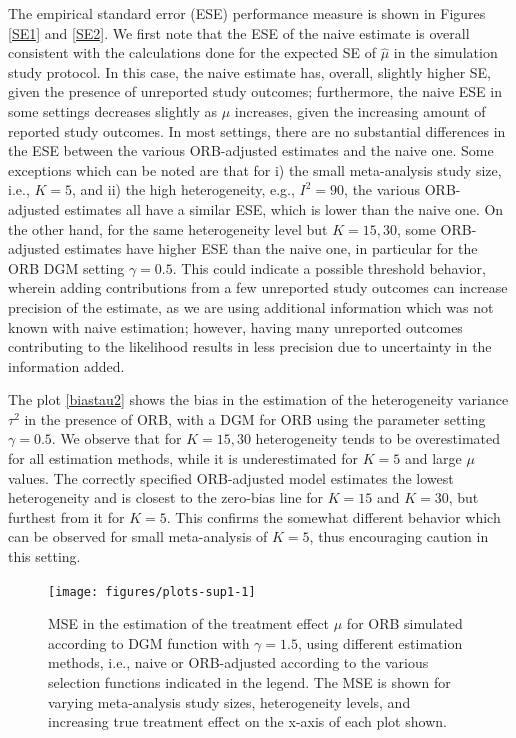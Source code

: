 \documentclass{article}\usepackage[]{graphicx}\usepackage[]{xcolor}
\providecommand{\DIFaddbegin}{} %
\providecommand{\DIFaddend}{} %
\newcommand{\DIFaddincludegraphics}[2][]{{\color{blue}\fbox{\DIFOincludegraphics[#1]{#2}}}} %
\DeclareRobustCommand{\DIFaddbegin}{\DIFOaddbegin \let\includegraphics\DIFaddincludegraphics} %
\DeclareRobustCommand{\DIFaddend}{\DIFOaddend \let\includegraphics\DIFOincludegraphics} %
\begin{document}
\DIFaddbegin \bigskip

\DIFaddend %
The empirical standard error (ESE) performance measure is shown in Figures \ref{SE1} and \ref{SE2}. We first note that the ESE of the naive estimate is overall consistent with the calculations done for the expected SE of $\hat{\mu}$ in the simulation study protocol. In this case, the naive estimate has, overall, slightly higher SE, given the presence of unreported study outcomes; furthermore, the naive ESE in some settings decreases slightly as $\mu$ increases, given the increasing amount of reported study outcomes. In most settings, there are no substantial differences in the ESE between the various ORB-adjusted estimates and the naive one. Some exceptions which can be noted are that for i) the small meta-analysis study size, i.e., $K=5$, and ii) the high heterogeneity, e.g., $I^2=90$, the various ORB-adjusted estimates all have a similar ESE, which is lower than the naive one. On the other hand, for the same heterogeneity level but $K=15, 30$, some ORB-adjusted estimates have higher ESE than the naive one, in particular for the ORB DGM setting $\gamma=0.5$. This could indicate a possible threshold behavior, wherein adding contributions from a few unreported study outcomes can increase precision of the estimate, as we are using additional information which was not known with naive estimation; however, having many unreported outcomes contributing to the likelihood results in less precision due to uncertainty in the information added. 

\DIFaddbegin \bigskip

\DIFaddend The plot \ref{biastau2} shows the bias in the estimation of the heterogeneity variance $\tau^2$ in the presence of ORB, with a DGM for ORB using the parameter setting $\gamma=0.5$. We observe that for $K=15,30$ heterogeneity tends to be overestimated for all estimation methods, while it is underestimated for $K=5$ and large $\mu$ values. The correctly specified ORB-adjusted model estimates the lowest heterogeneity and is closest to the zero-bias line for $K=15$ and $K=30$, but furthest from it for $K=5$. This confirms the somewhat different behavior which can be observed for small meta-analysis of $K=5$, thus encouraging caution in this setting.




\begin{figure}[!hbt]
\centering
\caption{MSE in the estimation of the treatment effect $\mu$ for ORB simulated according to DGM function with $\gamma=1.5$, using different estimation methods, i.e., naive or ORB-adjusted according to the various selection functions indicated in the legend. The MSE is shown for varying meta-analysis study sizes, heterogeneity levels, and increasing true treatment effect on the x-axis of each plot shown.\\[0.5em]}


{\centering \texttt{[image: figures/plots-sup1-1]} 

}



\label{MSE1}
\end{figure}
\end{document}
